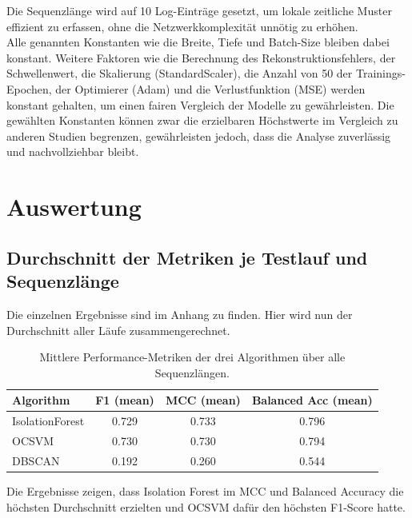 \documentclass[a4paper,12pt]{article}
\begin{document}
	Die Sequenzlänge wird auf 10 Log-Einträge gesetzt, um lokale zeitliche Muster effizient zu erfassen, ohne die Netzwerkkomplexität unnötig zu erhöhen.
	\\[0.5em]
	Alle genannten Konstanten wie die Breite, Tiefe und Batch-Size bleiben dabei konstant. Weitere Faktoren wie die Berechnung des Rekonstruktionsfehlers, der Schwellenwert, die Skalierung (StandardScaler), die Anzahl von 50 der Trainings-Epochen, der Optimierer (Adam) und die Verlustfunktion (MSE) werden konstant gehalten, um einen fairen Vergleich der Modelle zu gewährleisten. Die gewählten Konstanten können zwar die erzielbaren Höchstwerte im Vergleich zu anderen Studien begrenzen, gewährleisten jedoch, dass die Analyse zuverlässig und nachvollziehbar bleibt.
	
	\section{Auswertung}
	\subsection{Durchschnitt der Metriken je Testlauf und Sequenzlänge}
	Die einzelnen Ergebnisse sind im Anhang zu finden. Hier wird nun der Durchschnitt aller Läufe zusammengerechnet.
	
	\begin{table}[H]
		\centering
		\begin{tabular}{lccc}
			\hline
			\textbf{Algorithm} & \textbf{F1 (mean)} & \textbf{MCC (mean)} & \textbf{Balanced Acc (mean)} \\
			\hline
			IsolationForest & 0.729 & 0.733 & 0.796 \\
			OCSVM           & 0.730 & 0.730 & 0.794 \\
			DBSCAN          & 0.192 & 0.260 & 0.544 \\
			\hline
		\end{tabular}
		\caption{Mittlere Performance-Metriken der drei Algorithmen über alle Sequenzlängen.}
		\label{tab:algorithm_performance}
	\end{table}
	
	Die Ergebnisse zeigen, dass Isolation Forest im MCC und Balanced Accuracy die höchsten Durchschnitt erzielten und OCSVM dafür den höchsten F1-Score hatte.
	
\end{document}
